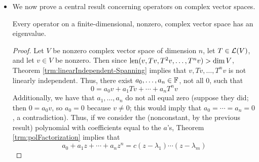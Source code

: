 \documentclass[../main.tex]{subfiles}
\begin{document}
\begin{itemize}
\begin{theorem}
\begin{enumerate}[label={\textup{(}\alph*\textup{)}}]
\begin{proof}
                Suppose $p(z)=\sum_{j=0}^ma_jz^j$ and $q(z)=\sum_{k=0}^nb_kz^k$ for all $z\in\F$. Then
                \begin{equation*}
                    (pq)(z) = \sum_{j=0}^m\sum_{k=0}^na_jb_kz^{j+k}
                \end{equation*}
                so
                \begin{align*}
                    (pq)(T) &= \sum_{j=0}^m\sum_{k=0}^na_jb_kT^{j+k}\\
                    &= \left( \sum_{j=0}^ma_jT^j \right)\left( \sum_{k=0}^nb_kT^k \right)\\
                    &= p(T)q(T)
                \end{align*}
                as desired.
            \end{proof}
            \item $p(T)q(T)=q(T)p(T)$.
            \begin{proof}
                It follows from part (a) that $p(T)q(T)=(pq)(T)=(qp)(T)=q(T)p(T)$, as desired.
            \end{proof}
        \end{enumerate}
    \end{theorem}
    \item We now prove a central result concerning operators on complex vector spaces.
    \begin{theorem}\label{trm:eigenExists}
        Every operator on a finite-dimensional, nonzero, complex vector space has an eigenvalue.
        \begin{proof}
            Let $V$ be nonzero complex vector space of dimension $n$, let $T\in\mathcal{L}(V)$, and let $v\in V$ be nonzero. Then since $\operatorname{len}(v,Tv,T^2v,\dots,T^nv)>\dim V$, Theorem \ref{trm:linearIndependent-Spanning} implies that $v,Tv,\dots,T^nv$ is not linearly independent. Thus, there exist $a_0,\dots,a_n\in\mathbb{F}$, not all 0, such that
            \begin{equation*}
                0 = a_0v+a_1Tv+\cdots+a_nT^nv
            \end{equation*}
            Additionally, we have that $a_1,\dots,a_n$ do not all equal zero (suppose they did; then $0=a_0v$, so $a_0=0$ because $v\neq 0$; this would imply that $a_0=\cdots=a_n=0$, a contradiction). Thus, if we consider the (nonconstant, by the previous result) polynomial with coefficients equal to the $a$'s, Theorem \ref{trm:polFactorization} implies that
            \begin{equation*}
                a_0+a_1z+\cdots+a_nz^n = c(z-\lambda_1)\cdots(z-\lambda_m)

\end{equation*}
\end{proof}
\end{theorem}
\end{itemize}
\end{document}

